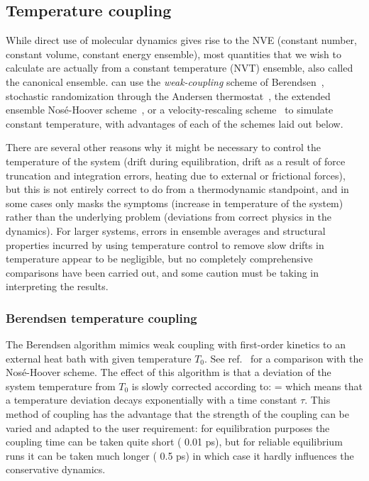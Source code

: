 \subsection{Temperature coupling}
While direct use of molecular dynamics gives rise to the NVE (constant
number, constant volume, constant energy ensemble), most quantities
that we wish to calculate are actually from a constant temperature
(NVT) ensemble, also called the canonical ensemble. {\gromacs} can use
the {\em weak-coupling} scheme of Berendsen~\cite{Berendsen84},
stochastic randomization through the Andersen
thermostat~\cite{Andersen80}, the extended ensemble Nos{\'e}-Hoover
scheme~\cite{Nose84,Hoover85}, or a velocity-rescaling
scheme~\cite{Bussi2007a} to simulate constant temperature, with
advantages of each of the schemes laid out below.

There are several other reasons why it might be necessary to control
the temperature of the system (drift during equilibration, drift as a
result of force truncation and integration errors, heating due to
external or frictional forces), but this is not entirely correct to do
from a thermodynamic standpoint, and in some cases only masks the
symptoms (increase in temperature of the system) rather than the
underlying problem (deviations from correct physics in the dynamics).
For larger systems, errors in ensemble averages and structural
properties incurred by using temperature control to remove slow drifts
in temperature appear to be negligible, but no completely
comprehensive comparisons have been carried out, and some caution must
be taking in interpreting the results.

\subsubsection{Berendsen temperature coupling}
The Berendsen algorithm mimics weak coupling with first-order 
kinetics to an external heat bath with given temperature $T_0$. 
See ref.~\cite{Berendsen91} for a comparison with the
Nos{\'e}-Hoover scheme. The effect of this algorithm is
that a deviation of the system temperature from $T_0$ is slowly
corrected according to:
\beq
{} = 
\label{eqn:Tcoupling}
\eeq
which means that a temperature deviation decays exponentially with a
time constant $\tau$.
This method of coupling has the advantage that the strength of the
coupling can be varied and adapted to the user requirement: for
equilibration purposes the coupling time can be taken quite short
({\eg} 0.01 ps), but for reliable equilibrium runs it can be taken much
longer ({\eg} 0.5 ps) in which case it hardly influences the
conservative dynamics. 

